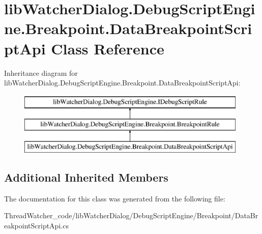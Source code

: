 \hypertarget{classlib_watcher_dialog_1_1_debug_script_engine_1_1_breakpoint_1_1_data_breakpoint_script_api}{\section{lib\+Watcher\+Dialog.\+Debug\+Script\+Engine.\+Breakpoint.\+Data\+Breakpoint\+Script\+Api Class Reference}
\label{classlib_watcher_dialog_1_1_debug_script_engine_1_1_breakpoint_1_1_data_breakpoint_script_api}
}
Inheritance diagram for lib\+Watcher\+Dialog.\+Debug\+Script\+Engine.\+Breakpoint.\+Data\+Breakpoint\+Script\+Api\+:\begin{figure}[H]
\begin{center}
\leavevmode
\includegraphics[height=3.000000cm]{classlib_watcher_dialog_1_1_debug_script_engine_1_1_breakpoint_1_1_data_breakpoint_script_api}
\end{center}
\end{figure}
\subsection*{Additional Inherited Members}


The documentation for this class was generated from the following file\+:\begin{DoxyCompactItemize}
\item 
Thread\+Watcher\+\_\+code/lib\+Watcher\+Dialog/\+Debug\+Script\+Engine/\+Breakpoint/Data\+Breakpoint\+Script\+Api.\+cs\end{DoxyCompactItemize}
